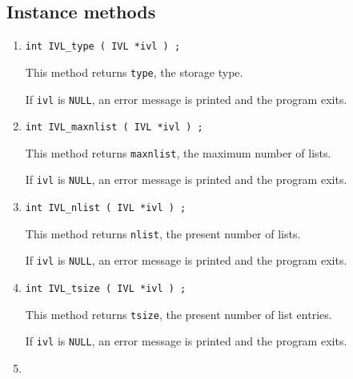 \subsection{Instance methods}
\label{subsection:IVL:proto:instance}
\par
\begin{enumerate}
\item
\begin{verbatim}
int IVL_type ( IVL *ivl ) ;
\end{verbatim}
This method returns {\tt type}, the storage type.
\par {}
If {\tt ivl} is {\tt NULL},
an error message is printed and the program exits.
\item
\begin{verbatim}
int IVL_maxnlist ( IVL *ivl ) ;
\end{verbatim}
This method returns {\tt maxnlist}, the maximum number of lists.
\par {}
If {\tt ivl} is {\tt NULL},
an error message is printed and the program exits.
\item
\begin{verbatim}
int IVL_nlist ( IVL *ivl ) ;
\end{verbatim}
This method returns {\tt nlist}, the present number of lists.
\par {}
If {\tt ivl} is {\tt NULL},
an error message is printed and the program exits.
\item
\begin{verbatim}
int IVL_tsize ( IVL *ivl ) ;
\end{verbatim}
This method returns {\tt tsize}, the present number of list entries.
\par {}
If {\tt ivl} is {\tt NULL},
an error message is printed and the program exits.
\item
\begin{verbatim}

\end{verbatim}
\end{enumerate}
